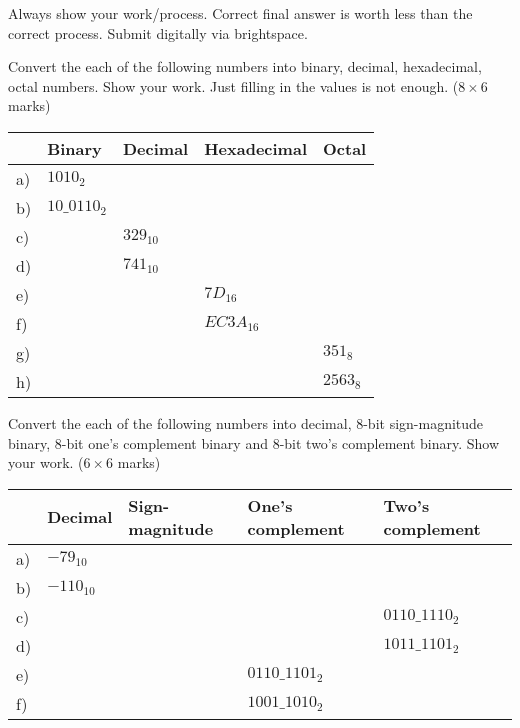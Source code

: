 Always show your work/process. Correct final answer is worth less than the
correct process. Submit digitally via brightspace.

\begin{prob}
  Convert the each of the following numbers into binary, decimal, hexadecimal,
octal numbers. Show your work. Just filling in the values is not enough. ($8 \times 6 $ marks)

  \begin{tabular}{lllll}
    \toprule
     & Binary & Decimal & Hexadecimal & Octal \\
    \midrule
    a)& $1010_2$     &   &   &    \\
    b)& $10\_0110_2$ &   &   &   \\
    c)&   & $329_{10}$   &   &   \\
    d)&   & $741_{10}$   &   &   \\
    e)&   &   & $7D_{16}$    &   \\
    f)&   &   & $EC3A_{16}$  &   \\
    g)&   &   &   & $351_8$\\
    h)&   &   &   & $2563_8$\\
    \bottomrule
  \end{tabular}
\end{prob}

\vspace{20em}

\begin{prob}
  Convert the each of the following numbers into decimal, 8-bit sign-magnitude binary,
  8-bit one's complement binary and 8-bit two's complement binary. Show your work. ($6 \times 6 $ marks)

  \begin{tabular}{lllll}
    \toprule
    & Decimal & Sign-magnitude & One's complement & Two's complement \\
    \midrule
    a) & $-79_{10}$ & & & \\
    b) & $-110_{10}$ & & & \\
    c) & & & & $0110\_1110_2$ \\
    d) & &  & & $1011\_1101_2$\\
    e) & & & $0110\_1101_2$&  \\
    f) & &  & $1001\_1010_2$& \\
    \bottomrule
  \end{tabular}
\end{prob}

\vspace{20em}


